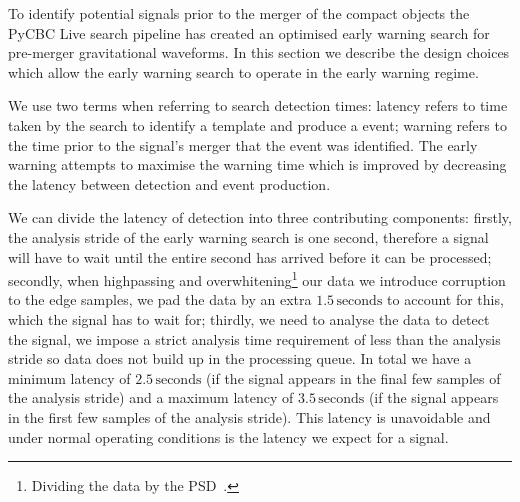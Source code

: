 To identify potential \gwadj signals prior to the merger of the compact objects the PyCBC Live search pipeline has created an optimised early warning search for pre-merger gravitational waveforms. In this section we describe the design choices which allow the early warning search to operate in the early warning regime.

We use two terms when referring to search detection times: latency refers to time taken by the search to identify a \gwadj template and produce a \gwadj event; warning refers to the time prior to the \gwadj signal's merger that the event was identified. The early warning attempts to maximise the warning time which is improved by decreasing the latency between detection and event production.

We can divide the latency of detection into three contributing components: firstly, the analysis stride of the early warning search is one second, therefore a signal will have to wait until the entire second has arrived before it can be processed; secondly, when highpassing and overwhitening\footnote{Dividing the data by the PSD~\cite{FINDCHIRP:2012}.} our data we introduce corruption to the edge samples, we pad the data by an extra $1.5 \, \text{seconds}$ to account for this, which the signal has to wait for; thirdly, we need to analyse the data to detect the signal, we impose a strict analysis time requirement of less than the analysis stride so data does not build up in the processing queue. In total we have a minimum latency of $2.5 \, \text{seconds}$ (if the signal appears in the final few samples of the analysis stride) and a maximum latency of $3.5 \, \text{seconds}$ (if the signal appears in the first few samples of the analysis stride). This latency is unavoidable and under normal operating conditions is the latency we expect for a signal.

